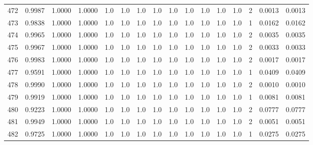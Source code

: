 \begin{tabular}{lrrrrrrrrrrrrrrr}
472 &      0.9987 &  1.0000 &  1.0000 &     1.0 &     1.0 &     1.0 &     1.0 &     1.0 &     1.0 &     1.0 &      1.0 &        1.0 &      2 &                    0.0013 &                     0.0013 \\
473 &      0.9838 &  1.0000 &  1.0000 &     1.0 &     1.0 &     1.0 &     1.0 &     1.0 &     1.0 &     1.0 &      1.0 &        1.0 &      1 &                    0.0162 &                     0.0162 \\
474 &      0.9965 &  1.0000 &  1.0000 &     1.0 &     1.0 &     1.0 &     1.0 &     1.0 &     1.0 &     1.0 &      1.0 &        1.0 &      2 &                    0.0035 &                     0.0035 \\
475 &      0.9967 &  1.0000 &  1.0000 &     1.0 &     1.0 &     1.0 &     1.0 &     1.0 &     1.0 &     1.0 &      1.0 &        1.0 &      2 &                    0.0033 &                     0.0033 \\
476 &      0.9983 &  1.0000 &  1.0000 &     1.0 &     1.0 &     1.0 &     1.0 &     1.0 &     1.0 &     1.0 &      1.0 &        1.0 &      2 &                    0.0017 &                     0.0017 \\
477 &      0.9591 &  1.0000 &  1.0000 &     1.0 &     1.0 &     1.0 &     1.0 &     1.0 &     1.0 &     1.0 &      1.0 &        1.0 &      1 &                    0.0409 &                     0.0409 \\
478 &      0.9990 &  1.0000 &  1.0000 &     1.0 &     1.0 &     1.0 &     1.0 &     1.0 &     1.0 &     1.0 &      1.0 &        1.0 &      2 &                    0.0010 &                     0.0010 \\
479 &      0.9919 &  1.0000 &  1.0000 &     1.0 &     1.0 &     1.0 &     1.0 &     1.0 &     1.0 &     1.0 &      1.0 &        1.0 &      1 &                    0.0081 &                     0.0081 \\
480 &      0.9223 &  1.0000 &  1.0000 &     1.0 &     1.0 &     1.0 &     1.0 &     1.0 &     1.0 &     1.0 &      1.0 &        1.0 &      2 &                    0.0777 &                     0.0777 \\
481 &      0.9949 &  1.0000 &  1.0000 &     1.0 &     1.0 &     1.0 &     1.0 &     1.0 &     1.0 &     1.0 &      1.0 &        1.0 &      2 &                    0.0051 &                     0.0051 \\
482 &      0.9725 &  1.0000 &  1.0000 &     1.0 &     1.0 &     1.0 &     1.0 &     1.0 &     1.0 &     1.0 &      1.0 &        1.0 &      1 &                    0.0275 &                     0.0275 \\

\end{tabular}
